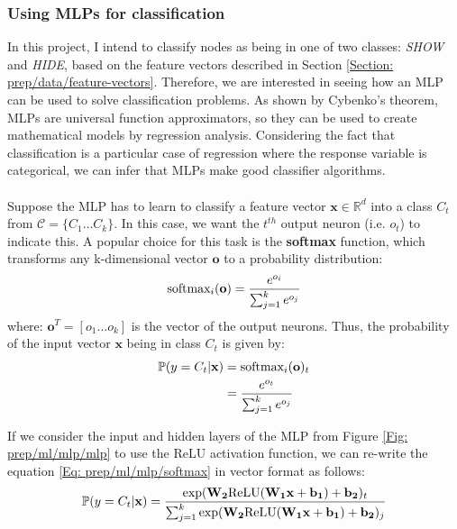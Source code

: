 	\subsubsection*{Using MLPs for classification}
	In this project, I intend to classify nodes as being in one of two classes: \textit{SHOW} and \textit{HIDE}, based on the feature vectors described in Section \ref{Section: prep/data/feature-vectors}. Therefore, we are interested in seeing how an MLP can be used to solve classification problems. As shown by Cybenko's theorem\cite{sigmoidal}, MLPs are universal function approximators, so they can be used to create mathematical models by regression analysis. Considering the fact that classification is a particular case of regression where the response variable is categorical, we can infer that MLPs make good classifier algorithms. 
	\\ \\
	Suppose the MLP has to learn to classify a feature vector $\mathbf{x} \in \mathbb{R}^d$ into a class $C_t$ from $\mathcal{C} = \{C_1\dots C_k\}$. In this case, we want the $t^{th}$ output neuron (i.e. $o_t$) to indicate this. A popular choice for this task is the \textbf{softmax} function, which transforms any k-dimensional vector $\mathbf{o}$ to a probability distribution:
	\begin{equation}
		\centering
		\text{softmax}_i(\mathbf{o}) = \frac{e^{o_i}}{\sum_{j=1}^{k}e^{o_j}}
	\end{equation}
	where: $\mathbf{o}^T = [o_1\dots o_k]$ is the vector of the output neurons. Thus, the probability of the input vector $\mathbf{x}$ being in class $C_t$ is given by:
	\begin{equation}
		\centering
		\begin{split}
			\mathbb{P}(y = C_t | \mathbf{x}) & = \text{softmax}_i(\mathbf{o})_t \\
			& = \frac{e^{o_t}}{\sum_{j=1}^{k}e^{o_j}}
		\end{split}
		\label{Eq: prep/ml/mlp/softmax}
	\end{equation} 
	
	If we consider the input and hidden layers of the MLP from Figure \ref{Fig: prep/ml/mlp/mlp} to use the ReLU activation function, we can re-write the equation \ref{Eq: prep/ml/mlp/softmax} in vector format as follows: 
	\begin{equation}
		\centering
		\mathbb{P}(y=C_t | \mathbf{x}) = \frac
		{
			\exp (\mathbf{W_2}\text{ReLU}(\mathbf{W_1 x} + \mathbf{b_1}) + \mathbf{b_2})_t
		}
		{
			{\sum_{j=1}^{k}\exp (\mathbf{W_2}\text{ReLU}(\mathbf{W_1 x} + \mathbf{b_1}) + \mathbf{b_2})_j}
		} 
	\end{equation}
	
